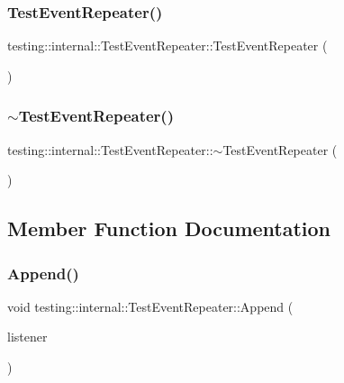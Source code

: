 \subsubsection{\texorpdfstring{TestEventRepeater()}{TestEventRepeater()}}
{\footnotesize\ttfamily testing\+::internal\+::\+Test\+Event\+Repeater\+::\+Test\+Event\+Repeater (\begin{DoxyParamCaption}{ }\end{DoxyParamCaption})\hspace{0.3cm}{\ttfamily [inline]}}

\mbox{\label{classtesting_1_1internal_1_1TestEventRepeater_a0f7129002fc4a33e29ce76a3b6df8d1b}} 
\subsubsection{\texorpdfstring{$\sim$TestEventRepeater()}{~TestEventRepeater()}}
{\footnotesize\ttfamily testing\+::internal\+::\+Test\+Event\+Repeater\+::$\sim$\+Test\+Event\+Repeater (\begin{DoxyParamCaption}{ }\end{DoxyParamCaption})\hspace{0.3cm}{\ttfamily [virtual]}}



\subsection{Member Function Documentation}
\mbox{\label{classtesting_1_1internal_1_1TestEventRepeater_ad154ce021881721a5c46994316b14cb1}} 
\subsubsection{\texorpdfstring{Append()}{Append()}}
{\footnotesize\ttfamily void testing\+::internal\+::\+Test\+Event\+Repeater\+::\+Append (\begin{DoxyParamCaption}\item[{\mbox{\hyperlink{classtesting_1_1TestEventListener}{Test\+Event\+Listener}} $\ast$}]{listener }\end{DoxyParamCaption})}

